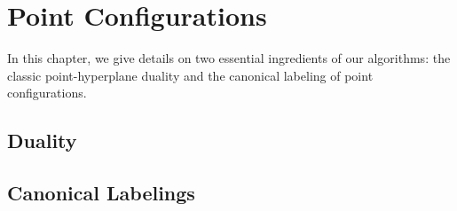 \chapter{\done Point Configurations}

In this chapter,
we give details on two essential ingredients of our algorithms:
the classic point-hyperplane duality
and
the canonical labeling of point configurations.

\section{Duality}


\section{Canonical Labelings}

